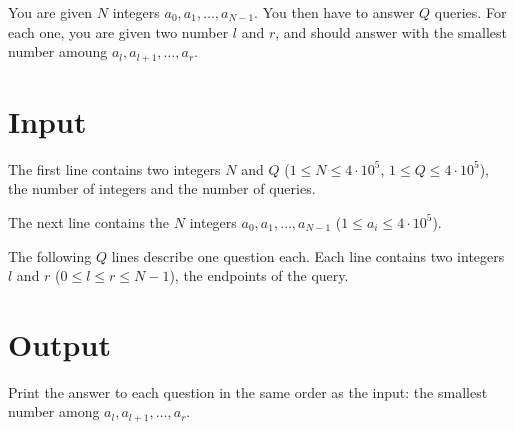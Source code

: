 
You are given $N$ integers $a_0, a_1, \dots, a_{N-1}$. You then have to answer $Q$ queries. For each one,
you are given two number $l$ and $r$, and should answer with the smallest number amoung $a_l,a_{l+1},\dots,a_{r}$.

\section*{Input}
The first line contains two integers $N$ and $Q$ ($1 \leq N \leq 4 \cdot 10^5$, $1 \leq Q \leq 4 \cdot 10^5$),
the number of integers and the number of queries.

The next line contains the $N$ integers $a_0, a_1, \dots, a_{N-1}$ ($1 \leq a_i \leq 4 \cdot 10^5$).

The following $Q$ lines describe one question each. Each line contains two integers $l$ and $r$ ($0 \leq l \leq r \leq N-1$),
the endpoints of the query.


\section*{Output}
Print the answer to each question in the same order as the input: the smallest number among $a_l, a_{l+1},\dots,a_{r}$.
